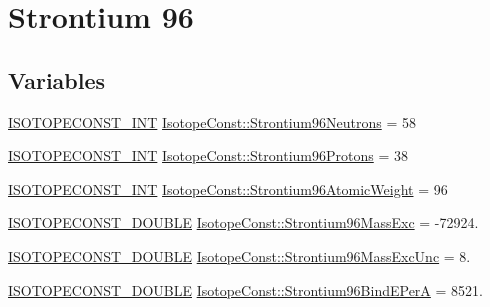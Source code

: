 \hypertarget{group___isotope_const-_strontium-_sr96}{}\section{Strontium 96}
\label{group___isotope_const-_strontium-_sr96}
\subsection*{Variables}
\begin{DoxyCompactItemize}
\item 
\mbox{\hyperlink{group___isotope_const-_macros_ga5f18360b3e99483a35c32d789e62621c}{I\+S\+O\+T\+O\+P\+E\+C\+O\+N\+S\+T\+\_\+\+I\+NT}} \mbox{\hyperlink{group___isotope_const-_strontium-_sr96_gad29a9a68c68e63d521ff8a3095d78ab7}{Isotope\+Const\+::\+Strontium96\+Neutrons}} = 58
\item 
\mbox{\hyperlink{group___isotope_const-_macros_ga5f18360b3e99483a35c32d789e62621c}{I\+S\+O\+T\+O\+P\+E\+C\+O\+N\+S\+T\+\_\+\+I\+NT}} \mbox{\hyperlink{group___isotope_const-_strontium-_sr96_ga0b6a57c8a0a338248b443e1a30974b1d}{Isotope\+Const\+::\+Strontium96\+Protons}} = 38
\item 
\mbox{\hyperlink{group___isotope_const-_macros_ga5f18360b3e99483a35c32d789e62621c}{I\+S\+O\+T\+O\+P\+E\+C\+O\+N\+S\+T\+\_\+\+I\+NT}} \mbox{\hyperlink{group___isotope_const-_strontium-_sr96_gac4fa06fe18f748002ca7fe9cbf92f8d5}{Isotope\+Const\+::\+Strontium96\+Atomic\+Weight}} = 96
\item 
\mbox{\hyperlink{group___isotope_const-_macros_ga8f45a7272ce02c0b4c65c44636ed719a}{I\+S\+O\+T\+O\+P\+E\+C\+O\+N\+S\+T\+\_\+\+D\+O\+U\+B\+LE}} \mbox{\hyperlink{group___isotope_const-_strontium-_sr96_ga8d5941a127c500460749421991f4f8fc}{Isotope\+Const\+::\+Strontium96\+Mass\+Exc}} = -\/72924.
\item 
\mbox{\hyperlink{group___isotope_const-_macros_ga8f45a7272ce02c0b4c65c44636ed719a}{I\+S\+O\+T\+O\+P\+E\+C\+O\+N\+S\+T\+\_\+\+D\+O\+U\+B\+LE}} \mbox{\hyperlink{group___isotope_const-_strontium-_sr96_ga8421456b134d18ae5f18cd36ba6caff5}{Isotope\+Const\+::\+Strontium96\+Mass\+Exc\+Unc}} = 8.
\item 
\mbox{\hyperlink{group___isotope_const-_macros_ga8f45a7272ce02c0b4c65c44636ed719a}{I\+S\+O\+T\+O\+P\+E\+C\+O\+N\+S\+T\+\_\+\+D\+O\+U\+B\+LE}} \mbox{\hyperlink{group___isotope_const-_strontium-_sr96_ga03f3808d4b28e17a091509e330060e58}{Isotope\+Const\+::\+Strontium96\+Bind\+E\+PerA}} = 8521.
\item 

\end{DoxyCompactItemize}
